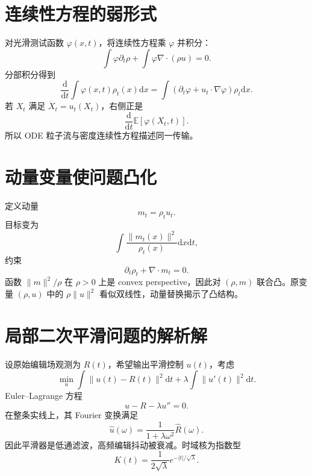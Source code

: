 \documentclass[UTF8,12pt,a4paper,fontset=none]{ctexart}
\numberwithin{equation}{section}
\newcommand{\E}{\mathbb{E}}
\newcommand{\dd}{\mathrm{d}}
\begin{document}
\section{连续性方程的弱形式}
对光滑测试函数 $\varphi(x,t)$，将连续性方程乘 $\varphi$ 并积分：
\begin{equation}
 \int\varphi\partial_t\rho+
 \int\varphi\nabla\cdot(\rho u)=0.
\end{equation}
分部积分得到
\begin{equation}
 \frac{\dd}{\dd t}\int\varphi(x,t)\rho_t(x)\dd x
 =\int\left(\partial_t\varphi+
 u_t\cdot\nabla\varphi\right)\rho_t\dd x.
\end{equation}
若 $X_t$ 满足 $\dot X_t=u_t(X_t)$，右侧正是
\begin{equation}
 \frac{\dd}{\dd t}\E[\varphi(X_t,t)].
\end{equation}
所以 ODE 粒子流与密度连续性方程描述同一传输。

\section{动量变量使问题凸化}
定义动量
\begin{equation}
 m_t=\rho_tu_t.
\end{equation}
目标变为
\begin{equation}
 \int\frac{\|m_t(x)\|^2}{\rho_t(x)}\dd x\dd t,
\end{equation}
约束
\begin{equation}
 \partial_t\rho_t+\nabla\cdot m_t=0.
\end{equation}
函数 $\|m\|^2/\rho$ 在 $\rho>0$ 上是 convex perspective，因此对 $(\rho,m)$ 联合凸。原变量 $(\rho,u)$ 中的 $\rho\|u\|^2$ 看似双线性，动量替换揭示了凸结构。

\section{局部二次平滑问题的解析解}
设原始编辑场观测为 $R(t)$，希望输出平滑控制 $u(t)$，考虑
\begin{equation}
 \min_u
 \int\|u(t)-R(t)\|^2\dd t+
 \lambda\int\|u'(t)\|^2\dd t.
\end{equation}
Euler--Lagrange 方程
\begin{equation}
 u-R-\lambda u''=0.
\end{equation}
在整条实线上，其 Fourier 变换满足
\begin{equation}
 \widehat u(\omega)=
 \frac1{1+\lambda\omega^2}\widehat R(\omega).
\end{equation}
因此平滑器是低通滤波，高频编辑抖动被衰减。时域核为指数型
\begin{equation}
 K(t)=\frac1{2\sqrt\lambda}e^{-|t|/\sqrt\lambda}.
\end{equation}
\end{document}
